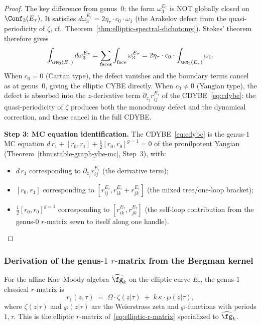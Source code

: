\begin{proof}
The key difference from genus~$0$: the form $\omega_3^{E_\tau}$ is
NOT globally closed on $\Conf_3(E_\tau)$. It satisfies
$d\omega_3^{E_\tau} = 2\eta_\tau \cdot c_0 \cdot \omega_1$
(the Arakelov defect from the quasi-periodicity of $\zeta$,
cf.\ Theorem~\ref{thm:elliptic-spectral-dichotomy}). Stokes'
theorem therefore gives
\[
\int_{\FM_3(E_\tau)} d\omega_3^{E_\tau}
= \sum_{\text{faces}} \int_{\text{face}} \omega_3^{E_\tau}
= 2\eta_\tau \cdot c_0 \cdot
\int_{\FM_3(E_\tau)} \omega_1.
\]
When $c_0 = 0$ (Cartan type), the defect vanishes and the boundary
terms cancel as at genus~$0$, giving the elliptic CYBE directly.
When $c_0 \ne 0$ (Yangian type), the defect is absorbed into the
$z$-derivative term $\partial_{z_j} r_{ij}^{E_\tau}$ of the
CDYBE~\eqref{eq:cdybe}: the quasi-periodicity of $\zeta$ produces
both the monodromy defect and the dynamical correction, and these
cancel in the full CDYBE.

\medskip
\noindent\textbf{Step 3: MC equation identification.}
The CDYBE~\eqref{eq:cdybe} is the genus-$1$ MC equation
$d\, r_1 + [r_0, r_1] + \frac{1}{2}[r_0, r_0]^{g=1} = 0$
of the pronilpotent Yangian
(Theorem~\ref{thm:stable-graph-ybe-mc}, Step~3), with:
\begin{itemize}
\item $d\, r_1$ corresponding to $\partial_{z_j}
r_{ij}^{E_\tau}$ (the derivative term);
\item $[r_0, r_1]$ corresponding to
$[r_{ij}^{E_\tau}, r_{ik}^{E_\tau} + r_{jk}^{E_\tau}]$
(the mixed tree/one-loop bracket);
\item $\frac{1}{2}[r_0, r_0]^{g=1}$ corresponding to
$[r_{ik}^{E_\tau}, r_{jk}^{E_\tau}]$ (the self-loop
contribution from the genus-$0$ $r$-matrix sewn to itself
along one handle).
\end{itemize}
\end{proof}

\subsubsection{Derivation of the genus-$1$ $r$-matrix from the
Bergman kernel}

\begin{theorem}
For the affine Kac--Moody algebra $\widehat{\fg}_k$ on the
elliptic curve $E_\tau$, the genus-$1$ classical $r$-matrix is
\begin{equation}
\boxed{
r_1(z, \tau)
\;=\;
\Omega \cdot \zeta(z|\tau)
\;+\;
k\,\kappa \cdot \wp(z|\tau),
}
\end{equation}
where $\zeta(z|\tau)$ and $\wp(z|\tau)$ are the Weierstrass
zeta and $\wp$-functions with periods $1, \tau$. This is the
elliptic $r$-matrix of~\eqref{eq:elliptic-r-matrix} specialized
to $\widehat{\fg}_k$.
\end{theorem}


